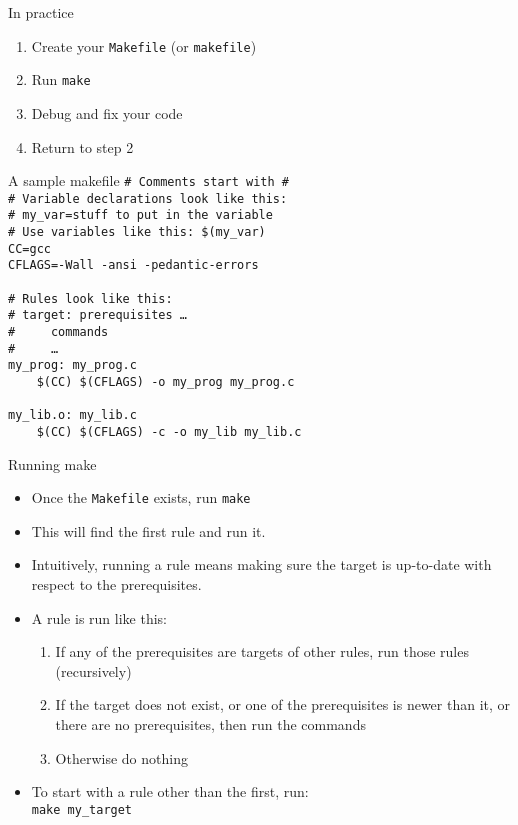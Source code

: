 \documentclass{beamer}
\begin{document}
\begin{frame}{In practice}
  \begin{enumerate}
    \item Create your \texttt{Makefile} (or \texttt{makefile})
    \item Run \texttt{make}
    \item Debug and fix your code
    \item Return to step 2
  \end{enumerate}
\end{frame}

\begin{frame}{A sample makefile}
\small
\texttt{\# Comments start with \# \\
\# Variable declarations look like this: \\
\# my\_var=stuff to put in the variable  \\
\# Use variables like this: \$(my\_var)  \\
CC=gcc \\
CFLAGS=-Wall -ansi -pedantic-errors \\
~\\
\# Rules look like this: \\
\# target: prerequisites \ldots \\
\# ~~~~commands \\ 
\# ~~~~\dots \\ 
my\_prog: my\_prog.c \\
~~~~\$(CC) \$(CFLAGS) -o my\_prog my\_prog.c \\
~\\
my\_lib.o: my\_lib.c \\
~~~~\$(CC) \$(CFLAGS) -c -o my\_lib my\_lib.c \\
}
\end{frame}

\begin{frame}{Running make}
  \begin{itemize}
    \item Once the \texttt{Makefile} exists, run \texttt{make}
    \item This will find the first rule and run it.
    \item Intuitively, running a rule means making sure the target is
      up-to-date with respect to the prerequisites.
    \item A rule is run like this:
      \begin{enumerate}
        \item If any of the prerequisites are targets of other rules, run
          those rules (recursively)
        \item If the target does not exist, or one of the prerequisites is
          newer than it, or there are no prerequisites, then run the commands
        \item Otherwise do nothing
      \end{enumerate}
    \item To start with a rule other than the first, run:\\
      \texttt{make my\_target}
  \end{itemize}
\end{frame}
\end{document}

